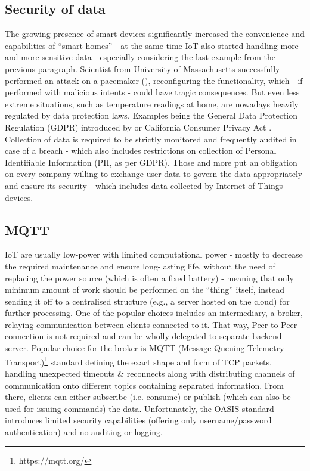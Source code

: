 \subsection{Security of data}
The growing presence of smart-devices significantly increased the convenience and capabilities of ``smart-homes'' - at the same time IoT also started handling more and more sensitive data - especially considering the last example from the previous paragraph. Scientist from University of Massachusetts successfully performed an attack on a pacemaker (\citeauthor{4531149}), reconfiguring the functionality, which - if performed with malicious intents - could have tragic consequences. But even less extreme situations, such as temperature readings at home, are nowadays heavily regulated by data protection laws. Examples being the General Data Protection Regulation (GDPR) introduced by \citet{EUdataregulations2018} or California Consumer Privacy Act \citep{CCPA}. Collection of data is required to be strictly monitored and frequently audited in case of a breach - which also includes restrictions on collection of Personal Identifiable Information (PII, as per GDPR). Those and more put an obligation on every company willing to exchange user data to govern the data appropriately and ensure its security - which includes data collected by Internet of Things devices.

\subsection{MQTT}
IoT are usually low-power with limited computational power - mostly to decrease the required maintenance and ensure long-lasting life, without the need of replacing the power source (which is often a fixed battery) - meaning that only minimum amount of work should be performed on the ``thing'' itself, instead sending it off to a centralised structure (e.g., a server hosted on the cloud) for further processing. One of the popular choices includes an intermediary, a broker, relaying communication between clients connected to it. That way, Peer-to-Peer connection is not required and can be wholly delegated to separate backend server. Popular choice for the broker is MQTT (Message Queuing Telemetry Transport)\footnote{https://mqtt.org/} standard defining the exact shape and form of TCP packets, handling unexpected timeouts \& reconnects along with distributing channels of communication onto different topics containing separated information. From there, clients can either subscribe (i.e. consume) or publish (which can also be used for issuing commands) the data. Unfortunately, the OASIS standard introduces limited security capabilities (offering only username/password authentication) and no auditing or logging.

